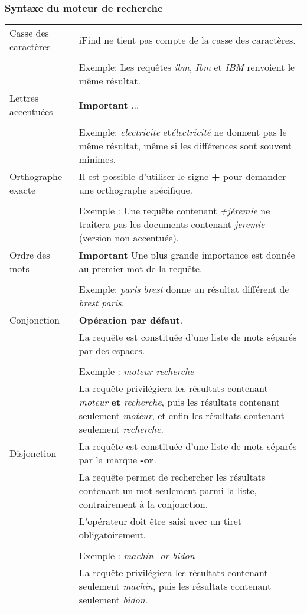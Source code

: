\subsubsection{Syntaxe du moteur de recherche}

\begin{longtable}{| p{5cm} | p{8cm} |}

\hline
Casse des caractères & iFind ne tient pas compte de la casse des caractères.\\
& \\
& Exemple: Les requêtes \textit{ibm}, \textit{Ibm} et \textit{IBM} renvoient le même résultat.\\


\hline
Lettres accentuées & \textbf{Important} ...\\
& \\
& Exemple: \textit{electricite} et\textit{électricité} ne donnent pas le même résultat, même si les différences
sont souvent minimes.\\

\hline
Orthographe exacte & Il est possible d'utiliser le signe \textbf{+} pour demander une orthographe spécifique. \\
& \\
& Exemple : Une requête contenant \textit{+jéremie} ne traitera pas 
les documents contenant \textit{jeremie} (version non accentuée).\\

\hline
Ordre des mots & \textbf{Important} Une plus grande importance est donnée au premier mot de la requête.\\
& \\
& Exemple: \textit{paris brest} donne un résultat différent de \textit{brest paris}.\\

\hline
Conjonction & \textbf{Opération par défaut}.\\
& La requête est constituée d'une liste de mots séparés par des espaces.\\
& \\
& Exemple : \textit{moteur recherche}\\
& La requête privilégiera les résultats 
contenant \textit{moteur} \textbf{et} \textit{recherche}, 
puis les résultats contenant seulement \textit{moteur},
et enfin les résultats contenant seulement \textit{recherche}.\\

\hline
Disjonction & La requête est constituée d'une liste de mots séparés par la marque \textbf{-or}.\\
& La requête permet de rechercher les résultats contenant un mot seulement parmi la liste,
contrairement à la conjonction.\\
& L'opérateur doit être saisi avec un tiret obligatoirement.\\
& \\
& Exemple : \textit{machin -or bidon}\\
& La requête privilégiera les résultats contenant seulement \textit{machin},
puis les résultats contenant seulement \textit{bidon}.\\


\end{longtable}
